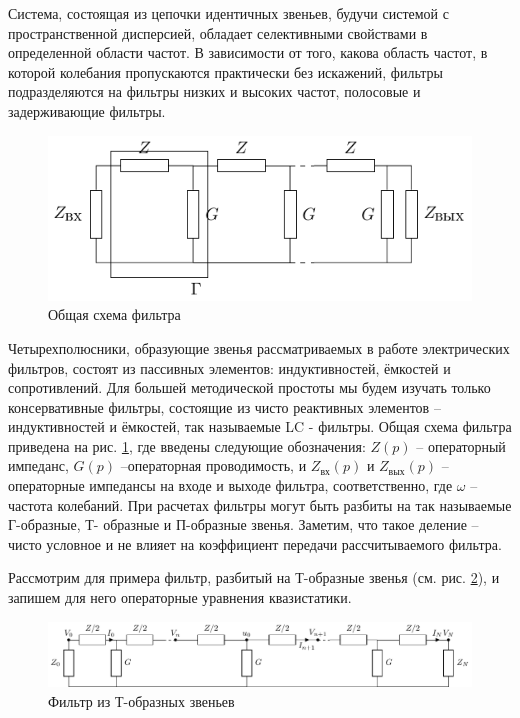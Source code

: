 Система, состоящая из цепочки идентичных звеньев, будучи системой с пространственной дисперсией, обладает селективными свойствами в определенной области частот. В зависимости от того, какова область частот, в которой колебания пропускаются практически без искажений, фильтры подразделяются на фильтры низких и высоких частот, полосовые и задерживающие фильтры.
\begin{figure}[h!]
	\centering
	\includegraphics[]{picture1.pdf}
	\caption{Общая схема фильтра}
	\label{fig:1}
\end{figure}
Четырехполюсники, образующие звенья рассматриваемых в работе электрических фильтров, состоят из пассивных элементов: индуктивностей, ёмкостей и сопротивлений. Для большей методической простоты мы будем изучать только консервативные фильтры, состоящие из чисто реактивных элементов – индуктивностей и ёмкостей, так называемые LC - фильтры. Общая схема фильтра приведена на рис. \ref{fig:1}, где введены следующие обозначения:  $Z(p)$ – 
операторный импеданс,   $G(p)$ –операторная проводимость,   и  $Z_{\text{вх}}(p)$ и $Z_{\text{вых}}(p)$ – операторные импедансы на входе и выходе фильтра, соответственно, где $\omega$ – частота колебаний. При расчетах фильтры могут быть разбиты на так называемые Г-образные, Т- образные и П-образные звенья. Заметим, что такое деление -- чисто условное и не влияет на коэффициент передачи рассчитываемого фильтра.

Рассмотрим для примера фильтр, разбитый на Т-образные звенья (см. рис. \ref{fig:2}), и запишем для него операторные уравнения квазистатики.

\begin{figure}[h!]
	\centering
	\includegraphics[]{picture2.pdf}
	\caption{Фильтр из Т-образных звеньев}
	\label{fig:2}
\end{figure}

